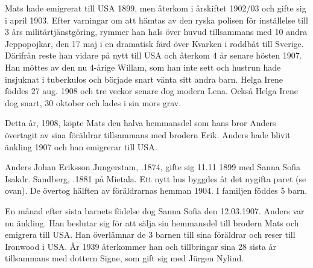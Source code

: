 Mats hade emigrerat till USA 1899, men återkom i årskiftet 1902/03 och gifte sig i april 1903. Efter varningar om att hämtas av den ryska polisen för inställelse till 3 års militärtjänstgöring, rymmer han hals över huvud tillsammans med 10 andra Jeppopojkar, den 17 maj i en dramatisk färd över Kvarken i roddbåt till Sverige. Därifrån reste han vidare på nytt till USA och återkom 4 år senare hösten 1907. Han möttes av den nu 4-årige Willam, som han inte sett och  hustrun hade insjuknat i tuberkulos och började snart vänta sitt andra barn. Helga Irene föddes 27 aug. 1908 och tre veckor senare dog modern Lena. Också Helga Irene dog snart, 30 oktober och lades i sin mors grav.

Detta år, 1908, köpte Mats den halva hemmansdel som hans bror Anders övertagit av sina föräldrar tillsammans med brodern Erik. Anders hade blivit änkling 1907 och han emigrerar till USA.


Anders Johan Eriksson Jungerstam, .1874, gifte sig 11.11 1899 med Sanna Sofia Isakdr. Sandberg, .1881 på Mietala. Ett nytt hus byggdes åt det nygifta paret (se ovan). De övertog hälften av föräldrarnas hemman 1904. I familjen föddes 5 barn.
\begin{jhchildren}
  \item {}
  \item {}
  \item {}
  \item {}
  \item {}
\end{jhchildren}
En månad efter sista barnets födelse dog Sanna Sofia den 12.03.1907. Anders var nu änkling. Han beslutar sig för att sälja sin hemmansdel till brodern Mats och emigrera till USA. Han överlämnar de 3 barnen till sina föräldrar och reser till Ironwood i USA. År 1939 återkommer han och tillbringar sina 28 sista år tillsammans med dottern Signe, som gift sig med Jürgen Nylind.





